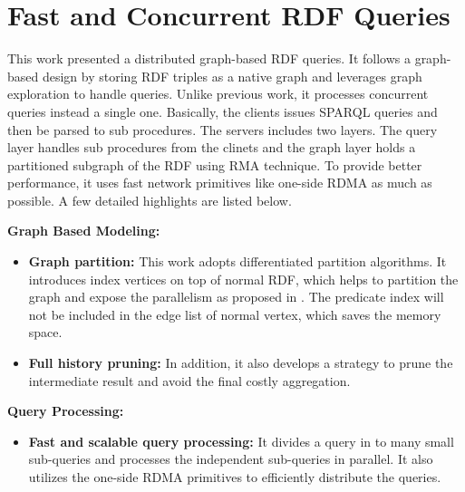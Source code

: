 \section{Fast and Concurrent RDF Queries}
This work \cite{shi2016fast} presented a distributed graph-based RDF queries.
It follows a graph-based design by storing RDF triples as a native graph and
leverages graph exploration to handle queries. Unlike previous work, it
processes concurrent queries instead a single one. Basically, the clients issues
SPARQL queries and then be parsed to sub procedures. The servers includes two
layers. The query layer handles sub procedures from the clinets and the graph
layer holds a partitioned subgraph of the RDF using RMA technique. To provide
better performance, it uses fast network primitives like one-side RDMA as much
as possible. A few detailed highlights are listed below.

\textbf{Graph Based Modeling:}
\begin{itemize}
    \item \textbf{Graph partition:} This work adopts differentiated
        partition algorithms. It introduces
        index vertices on top of normal RDF, which helps to partition the graph
        and expose the parallelism as proposed in \cite{chen2015powerlyra}.
        The predicate index will not be included in the
        edge list of normal vertex, which saves the memory space.

    \item \textbf{Full history pruning:} In addition, it also develops a
        strategy to prune the intermediate result and avoid the final costly
        aggregation.   

\end{itemize}

\textbf{Query Processing:}
\begin{itemize}
    \item \textbf{Fast and scalable query processing:} It divides a query in
        to many small sub-queries and processes the independent sub-queries in
        parallel. It also utilizes the one-side RDMA primitives to efficiently
        distribute the queries.

\end{itemize}
